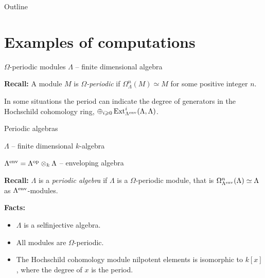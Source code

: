 \begin{frame}
  \titlepage
\end{frame}

\begin{frame}{Outline}
  \tableofcontents
\end{frame}

\section{Examples of computations}

\begin{frame}[fragile]{$\Omega$-periodic modules}
$\Lambda$ -- finite dimensional algebra\medskip

\textbf{Recall:} A module $M$ is \emph{$\Omega$-periodic} if
$\Omega^n_\Lambda(M)\simeq M$ for some positive integer $n$.\medskip 

In some situations the period can indicate the degree of generators in
the Hochschild cohomology ring, $\oplus_{i\geqslant
  0}\operatorname{Ext}\nolimits^i_{\Lambda^{\operatorname{env}\nolimits}}(\Lambda, \Lambda)$. 
\end{frame}

\begin{frame}[fragile]{Periodic algebras}

$\Lambda$ -- finite dimensional $k$-algebra\medskip

$\Lambda^{\operatorname{env}\nolimits} = \Lambda^{\operatorname{op}\nolimits}\otimes_k \Lambda$ -- enveloping
algebra\medskip

\textbf{Recall:} $\Lambda$ is a \emph{periodic algebra} if $\Lambda$ is a
$\Omega$-periodic module, that is $\Omega^n_{\Lambda^{\operatorname{env}\nolimits}}(\Lambda)
\simeq \Lambda$ as $\Lambda^{\operatorname{env}\nolimits}$-modules.\medskip

\textbf{Facts:}
\begin{itemize}
\item $\Lambda$ is a selfinjective algebra.
\item All modules are $\Omega$-periodic.
\item The Hochschild cohomology module nilpotent elements is
  isomorphic to $k[x]$, where the degree of $x$ is the period.
\end{itemize}
\end{frame}

